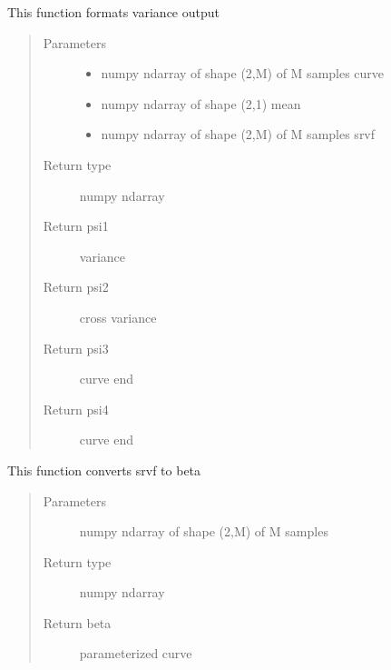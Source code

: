 \documentclass[letterpaper,10pt,english]{sphinxmanual}
\begin{document}
\begin{fulllineitems}
\label{\detokenize{curve_functions:curve_functions.psi}}
This function formats variance output
\begin{quote}\begin{description}
\item[{Parameters}] \leavevmode\begin{itemize}
\item {} 
 \textendash{} numpy ndarray of shape (2,M) of M samples curve

\item {} 
 \textendash{} numpy ndarray of shape (2,1) mean

\item {} 
 \textendash{} numpy ndarray of shape (2,M) of M samples srvf

\end{itemize}

\item[{Return type}] \leavevmode
numpy ndarray

\item[{Return psi1}] \leavevmode
variance

\item[{Return psi2}] \leavevmode
cross variance

\item[{Return psi3}] \leavevmode
curve end

\item[{Return psi4}] \leavevmode
curve end

\end{description}\end{quote}

\end{fulllineitems}


\begin{fulllineitems}
\label{\detokenize{curve_functions:curve_functions.q_to_curve}}
This function converts srvf to beta
\begin{quote}\begin{description}
\item[{Parameters}] \leavevmode
{} \textendash{} numpy ndarray of shape (2,M) of M samples

\item[{Return type}] \leavevmode
numpy ndarray

\item[{Return beta}] \leavevmode
parameterized curve

\end{description}\end{quote}

\end{fulllineitems}
\end{document}

